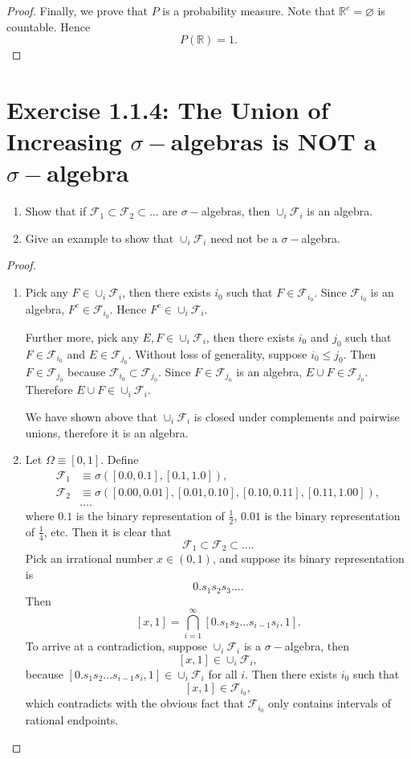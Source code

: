 \documentclass{amsbook}
\theoremstyle{definition}
\theoremstyle{remark}
\numberwithin{section}{chapter}
\numberwithin{equation}{chapter}
\begin{document}
\begin{proof}
Finally, we prove that $P$ is a probability measure. Note that $\mathbb{R}^c=\varnothing$ is countable. Hence\[
P(\mathbb{R})=1.
\]
\end{proof}
\section{Exercise 1.1.4: The Union of Increasing $\sigma-$algebras is NOT a $\sigma-$algebra}
\begin{enumerate}
\item Show that if $\mathcal{F}_1\subset\mathcal{F}_2\subset\dots$ are $\sigma-$algebras, then $\cup_i\mathcal{F}_i$ is an algebra.
\item Give an example to show that $\cup_i\mathcal{F}_i$ need not be a $\sigma-$algebra.
\end{enumerate}
\begin{proof}
\begin{enumerate}
\item Pick any $F\in\cup_i\mathcal{F}_i$, then there exists $i_0$ such that $F\in\mathcal{F}_{i_0}$. Since $\mathcal{F}_{i_0}$ is an algebra, $F^c\in\mathcal{F}_{i_0}$. Hence $F^c\in\cup_i\mathcal{F}_i$.

Further more, pick any $E,F\in\cup_i\mathcal{F}_i$, then there exists $i_0$ and $j_0$ such that $F\in\mathcal{F}_{i_0}$ and $E\in\mathcal{F}_{j_0}$. Without loss of generality, suppose $i_0\leqslant j_0$. Then $F\in\mathcal{F}_{j_0}$ because $\mathcal{F}_{i_0}\subset\mathcal{F}_{j_0}$. Since $F\in\mathcal{F}_{j_0}$ is an algebra, $E\cup F\in\mathcal{F}_{j_0}$. Therefore $E\cup F\in\cup_i\mathcal{F}_i$.

We have shown above that $\cup_i\mathcal{F}_i$ is closed under complements and pairwise unions, therefore it is an algebra.
\item Let $\Omega\equiv[0,1]$. Define\[
\begin{split}
\mathcal{F}_1&\equiv\sigma\left([0.0,0.1],[0.1,1.0]\right),\\
\mathcal{F}_2&\equiv\sigma\left([0.00,0.01],[0.01,0.10],[0.10,0.11],[0.11,1.00]\right),\\
&\dots.
\end{split}
\]where $0.1$ is the binary representation of $\frac{1}{2}$, $0.01$ is the binary representation of $\frac{1}{4}$, etc. Then it is clear that\[
\mathcal{F}_1\subset\mathcal{F}_2\subset\dots.
\]Pick an irrational number $x\in(0,1)$, and suppose its binary representation is\[
0.s_1s_2s_3\dots.
\]Then\[
[x,1]=\bigcap_{i=1}^\infty[0.s_1s_2\dots s_{i-1}s_i,1].
\]To arrive at a contradiction, suppose $\cup_i\mathcal{F}_i$ is a $\sigma-$algebra, then\[
[x,1]\in\cup_i\mathcal{F}_i,
\]because $[0.s_1s_2\dots s_{i-1}s_i,1]\in\cup_i\mathcal{F}_i$ for all $i$. Then there exists $i_0$ such that\[
[x,1]\in\mathcal{F}_{i_0},
\]which contradicts with the obvious fact that $\mathcal{F}_{i_0}$ only contains intervals of rational endpoints.
\end{enumerate}
\end{proof}
\end{document}
